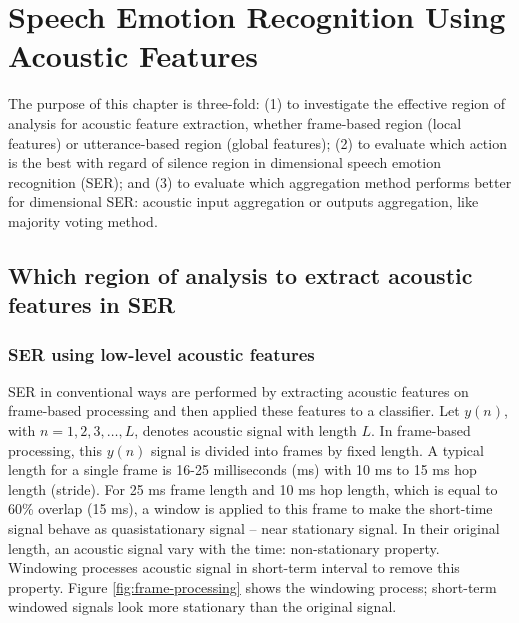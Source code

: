\chapter{Speech Emotion Recognition Using Acoustic Features}

The purpose of this chapter is three-fold: (1) to investigate the effective
region of analysis for acoustic feature extraction, whether frame-based region
(local features) or utterance-based region (global features); (2) to evaluate
which action is the best with regard of silence region in dimensional speech
emotion recognition (SER); and (3) to
evaluate which aggregation method performs better for dimensional SER: acoustic
input aggregation or outputs aggregation, like majority voting method. 

\section{Which region of analysis to extract acoustic features in SER}
\subsection{SER using low-level acoustic features}
SER in conventional ways are performed by extracting acoustic features on
frame-based processing and then applied these features to a classifier. Let
$y(n)$, with $ n = 1, 2, 3, \ldots , L$, denotes acoustic signal with length
$L$.  In frame-based processing, this $y(n)$ signal is divided into frames by
fixed length. A typical length for a single frame is 16-25 milliseconds (ms)
with 10 ms to 15 ms hop length (stride). For 25 ms frame length and 10 ms hop
length, which is equal to 60\% overlap (15 ms), a window is applied to this
frame to make the short-time signal behave as quasistationary signal -- near
stationary signal. In their original length, an acoustic signal vary with the
time: non-stationary property.  Windowing processes acoustic signal in
short-term interval to remove this property. Figure \ref{fig:frame-processing}
shows the windowing process; short-term windowed signals look more stationary
than the original signal.


